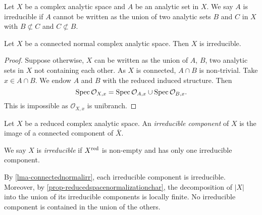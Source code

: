 \begin{definition}
    Let $X$ be a complex analytic space and $A$ be an analytic set in $X$. We say $A$ is irreducible if $A$ cannot be written as the union of two analytic sets $B$ and $C$ in $X$ with $B\not\subset C$ and $C\not\subset B$.
\end{definition}

\begin{lemma}\label{lma-connectednormalirr}
    Let $X$ be a connected normal complex analytic space. Then $X$ is irreducible.
\end{lemma}
\begin{proof}
    Suppose otherwise, $X$ can be written as the union of $A$, $B$, two analytic sets in $X$ not containing each other. As $X$ is connected, $A\cap B$ is non-trivial. Take $x\in A\cap B$. We endow $A$ and $B$ with the reduced induced structure. Then 
    \[
        \operatorname{Spec} \mathcal{O}_{X,x}=\operatorname{Spec} \mathcal{O}_{A,x}\cup  \operatorname{Spec} \mathcal{O}_{B,x}.
    \]
    This is impossible as $\mathcal{O}_{X,x}$ is unibranch.
\end{proof}

\begin{definition}
    Let $X$ be a reduced complex analytic space. An \emph{irreducible component} of $X$ is the image of a connected component of $\bar{X}$.

    We say $X$ is \emph{irreducible} if $X^{\operatorname{red}}$ is non-empty and has only one irreducible component.
\end{definition}
By \cref{lma-connectednormalirr}, each irreducible component is irreducible. Moreover, by \cref{prop-reducedspacenormalizationchar}, the decomposition of $|X|$ into the union of its irreducible components is locally finite. No irreducible component is contained in the union of the others.

